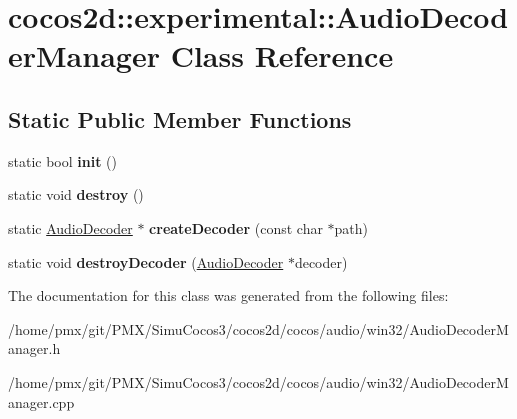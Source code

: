 \hypertarget{classcocos2d_1_1experimental_1_1AudioDecoderManager}{}\section{cocos2d\+:\+:experimental\+:\+:Audio\+Decoder\+Manager Class Reference}
\label{classcocos2d_1_1experimental_1_1AudioDecoderManager}
\subsection*{Static Public Member Functions}
\begin{DoxyCompactItemize}
\item 
\mbox{\label{classcocos2d_1_1experimental_1_1AudioDecoderManager_a7f3d39ecfb11d3020d7a086bfa4baa25}} 
static bool {\bfseries init} ()
\item 
\mbox{\label{classcocos2d_1_1experimental_1_1AudioDecoderManager_ac8e18aea8fef1351d4ca0e30317743c1}} 
static void {\bfseries destroy} ()
\item 
\mbox{\label{classcocos2d_1_1experimental_1_1AudioDecoderManager_ae98b2295d6b3958126b53a91bb8eb8db}} 
static \hyperlink{classcocos2d_1_1experimental_1_1AudioDecoder}{Audio\+Decoder} $\ast$ {\bfseries create\+Decoder} (const char $\ast$path)
\item 
\mbox{\label{classcocos2d_1_1experimental_1_1AudioDecoderManager_a717975489cc7db42ed07b7a268fe6741}} 
static void {\bfseries destroy\+Decoder} (\hyperlink{classcocos2d_1_1experimental_1_1AudioDecoder}{Audio\+Decoder} $\ast$decoder)
\end{DoxyCompactItemize}


The documentation for this class was generated from the following files\+:\begin{DoxyCompactItemize}
\item 
/home/pmx/git/\+P\+M\+X/\+Simu\+Cocos3/cocos2d/cocos/audio/win32/Audio\+Decoder\+Manager.\+h\item 
/home/pmx/git/\+P\+M\+X/\+Simu\+Cocos3/cocos2d/cocos/audio/win32/Audio\+Decoder\+Manager.\+cpp\end{DoxyCompactItemize}
